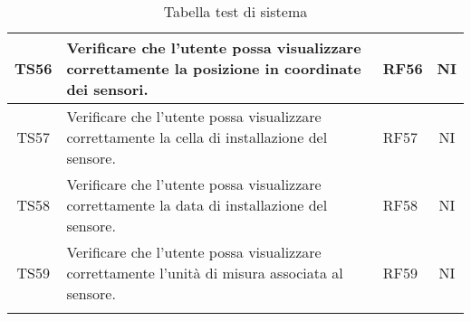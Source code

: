 \begin{longtable}{|c|p{5cm}|>{\raggedright}p{2cm}|c|}
        TS56 & Verificare che l'utente possa visualizzare correttamente la posizione in coordinate dei sensori. & RF56 & NI \\
        \hline
        TS57 & Verificare che l'utente possa visualizzare correttamente la cella di installazione del sensore. & RF57 & NI \\
        \hline
        TS58 & Verificare che l'utente possa visualizzare correttamente la data di installazione del sensore. & RF58 & NI \\
        \hline
        TS59 & Verificare che l'utente possa visualizzare correttamente l'unità di misura associata al sensore. & RF59 & NI \\
        \hline
    \caption{Tabella test di sistema}
    \label{tab:testsSistema}
\end{longtable}